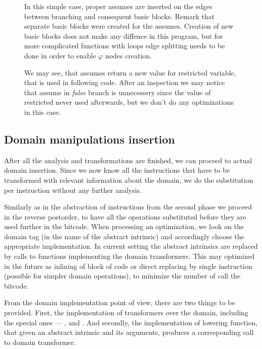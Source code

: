 \begin{figure}
\begin{example}
In this simple case, proper assumes are inserted on the edges between branching
and consequent basic blocks. Remark that separate basic blocks were created for
the assumes. Creation of new basic blocks does not make any diffence in this
program, but for more complicated functions with loops edge splitting needs
to be done in order to enable $\varphi$ nodes creation.

We may see, that assumes return a new value for restricted variable, that is
used in following code. After an inspection we may notice that assume in
\emph{false} branch is unnecessery since the value of restricted
 never used afterwards, but we don't do any optimizations
in this case.
\end{example}
\end{figure}

\subsection{ Domain manipulations insertion }

After all the analysis and transformations are finished, we can proceed to actual
domain insertion. Since we now know all the instructions that have to be
transformed with relevant information about the domain, we do the substitution
per instruction without any further analysis.

Similarly as in the abstraction of instructions from the second phase we proceed in
the reverse postorder, to have all the operations substituted before they are
used further in the bitcode. When processing an optimization, we look on the
domain tag (in the name of the abstract intrinsic) and accordingly choose the
appropriate implementation. In current setting the abstract intrinsics are
replaced by calls to functions implementing the domain transformers. This may
optimized in the future as inlining of block of code or direct replacing by single
instruction (possible for simpler domain operations), to minimize the number of
call the bitcode.

From the domain implementation point of view, there are two things to be
provided. First, the implementation of transformers over the domain, including
the special ones --- ,  and .
And secondly, the implementation of lowering function, that given an abstract
\LART intrinsic and its arguments, produces a corresponding call to domain
transformer.

